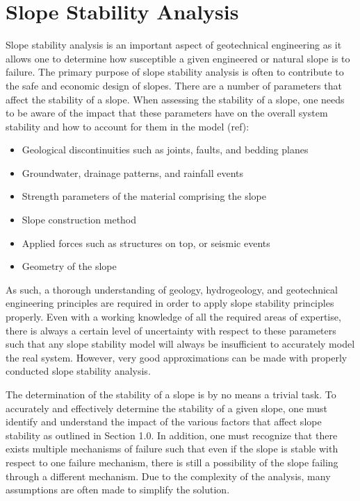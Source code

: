 \section{Slope Stability Analysis}
Slope stability analysis is an important aspect of geotechnical engineering as it allows one to determine how susceptible a given engineered or natural slope is to failure. The primary purpose of slope stability analysis is often to contribute to the safe and economic design of slopes. There are a number of parameters that affect the stability of a slope. When assessing the stability of a slope, one needs to be aware of the impact that these parameters have on the overall system stability and how to account for them in the model (ref):

\begin{itemize}
\item Geological discontinuities such as joints, faults, and bedding planes
\item Groundwater, drainage patterns, and rainfall events
\item Strength parameters of the material comprising the slope
\item Slope construction method
\item Applied forces such as structures on top, or seismic events
\item Geometry of the slope
\end{itemize}

As such, a thorough understanding of geology, hydrogeology, and geotechnical engineering principles are required in order to apply slope stability principles properly. Even with a working knowledge of all the required areas of expertise, there is always a certain level of uncertainty with respect to these parameters such that any slope stability model will always be insufficient to accurately model the real system. However, very good approximations can be made with properly conducted slope stability analysis.

The determination of the stability of a slope is by no means a trivial task. To accurately and effectively determine the stability of a given slope, one must identify and understand the impact of the various factors that affect slope stability as outlined in Section 1.0. In addition, one must recognize that there exists multiple mechanisms of failure such that even if the slope is stable with respect to one failure mechanism, there is still a possibility of the slope failing through a different mechanism. Due to the complexity of the analysis, many assumptions are often made to simplify the solution. 

